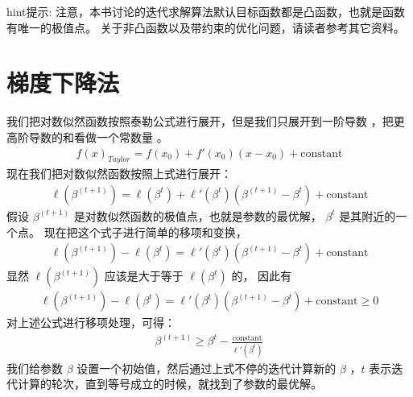 \documentclass[letterpaper,10pt,english]{sphinxmanual}
\begin{document}
\begin{sphinxadmonition}{hint}{提示:}
注意，本书讨论的迭代求解算法默认目标函数都是凸函数，也就是函数有唯一的极值点。
关于非凸函数以及带约束的优化问题，请读者参考其它资料。
\end{sphinxadmonition}


\section{梯度下降法}
\label{\detokenize{_u5e7f_u4e49_u7ebf_u6027_u6a21_u578b/estimate:id4}}
我们把对数似然函数按照泰勒公式进行展开，但是我们只展开到一阶导数
，把更高阶导数的和看做一个常数量 
。
\begin{equation}\label{equation:广义线性模型/estimate:广义线性模型/estimate:22}
\begin{split}f(x)_{Taylor} = f(x_0) + f'(x_0)(x-x_0) + \text{constant}\end{split}
\end{equation}
现在我们把对数似然函数按照上式进行展开：
\begin{equation}\label{equation:广义线性模型/estimate:eq_34_30}
\begin{split}\ell(\beta^{(t+1)}) = \ell(\beta^t) + \ell'(\beta^t)(\beta^{(t+1)} - \beta^t) + \text{constant}\end{split}
\end{equation}
假设 \(\beta^{(t+1)}\) 是对数似然函数的极值点，也就是参数的最优解，
\(\beta^t\) 是其附近的一个点。
现在把这个式子进行简单的移项和变换，
\begin{equation}\label{equation:广义线性模型/estimate:广义线性模型/estimate:23}
\begin{split}\ell(\beta^{(t+1)}) -  \ell(\beta^t) =\ell'(\beta^t)(\beta^{(t+1)} - \beta^t) +\text{constant}\end{split}
\end{equation}
显然 \(\ell(\beta^{(t+1)})\) 应该是大于等于 \(\ell(\beta^t)\) 的，
因此有
\begin{equation}\label{equation:广义线性模型/estimate:广义线性模型/estimate:24}
\begin{split}\ell(\beta^{(t+1)}) -  \ell(\beta^t) =\ell'(\beta^t)(\beta^{(t+1)} - \beta^t) +\text{constant} \ge 0\end{split}
\end{equation}
对上述公式进行移项处理，可得：
\begin{equation}\label{equation:广义线性模型/estimate:eq_34_31}
\begin{split}\beta^{(t+1)} \ge \beta^t - \frac{\text{constant}}{\ell'(\beta^t)}\end{split}
\end{equation}
我们给参数 \(\beta\) 设置一个初始值，然后通过上式不停的迭代计算新的 \(\beta\)
，\(t\) 表示迭代计算的轮次，直到等号成立的时候，就找到了参数的最优解。
\end{document}
